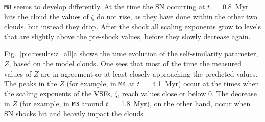 \texttt{M8} seems to develop differently.
At the time the SN occurring at $t$~=~0.8~Myr hits the cloud the values of $\zeta$ do not rise, as they have done within the other two clouds, but instead they drop. 
After the shock all scaling exponents grow to levels that are slightly above the pre-shock values, before they slowly decrease again.

Fig.~\ref{pic:results:z_all}a shows the time evolution of the self-similarity parameter, $Z$, based on the model clouds. 
One sees that most of the time the measured values of $Z$ are in agreement or at least closely approaching the predicted values.
The peaks in the $Z$ (for example, in \texttt{M4} at $t$~=~4.1~Myr) occur at the times when the scaling exponents of the VSFs, $\zeta$, reach values close or below 0.
The decrease in $Z$ (for example, in \texttt{M3} around $t$~=~1.8~Myr), on the other hand, occur when SN shocks hit and heavily impact the clouds. 

